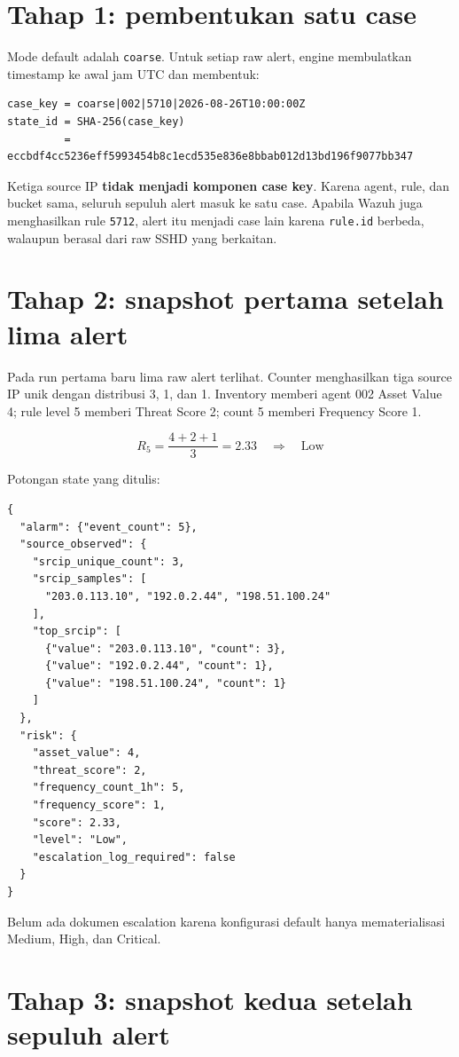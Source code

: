 \documentclass[11pt,a4paper,oneside]{report}
\DeclareRobustCommand{\code}[1]{\nolinkurl{#1}}
\begin{document}
\section{Tahap 1: pembentukan satu case}

Mode default adalah \code{coarse}. Untuk setiap raw alert, engine membulatkan
timestamp ke awal jam UTC dan membentuk:

\begin{lstlisting}
case_key = coarse|002|5710|2026-08-26T10:00:00Z
state_id = SHA-256(case_key)
         = eccbdf4cc5236eff5993454b8c1ecd535e836e8bbab012d13bd196f9077bb347
\end{lstlisting}

Ketiga source IP \textbf{tidak menjadi komponen case key}. Karena agent, rule,
dan bucket sama, seluruh sepuluh alert masuk ke satu case. Apabila Wazuh juga
menghasilkan rule \code{5712}, alert itu menjadi case lain karena
\code{rule.id} berbeda, walaupun berasal dari raw SSHD yang berkaitan.

\section{Tahap 2: snapshot pertama setelah lima alert}

Pada run pertama baru lima raw alert terlihat. Counter menghasilkan tiga source
IP unik dengan distribusi 3, 1, dan 1. Inventory memberi agent 002 Asset Value 4;
rule level 5 memberi Threat Score 2; count 5 memberi Frequency Score 1.

\[
R_5 = \frac{4+2+1}{3}=2.33 \quad\Longrightarrow\quad \text{Low}
\]

Potongan state yang ditulis:

\begin{lstlisting}
{
  "alarm": {"event_count": 5},
  "source_observed": {
    "srcip_unique_count": 3,
    "srcip_samples": [
      "203.0.113.10", "192.0.2.44", "198.51.100.24"
    ],
    "top_srcip": [
      {"value": "203.0.113.10", "count": 3},
      {"value": "192.0.2.44", "count": 1},
      {"value": "198.51.100.24", "count": 1}
    ]
  },
  "risk": {
    "asset_value": 4,
    "threat_score": 2,
    "frequency_count_1h": 5,
    "frequency_score": 1,
    "score": 2.33,
    "level": "Low",
    "escalation_log_required": false
  }
}
\end{lstlisting}

Belum ada dokumen escalation karena konfigurasi default hanya mematerialisasi
Medium, High, dan Critical.

\section{Tahap 3: snapshot kedua setelah sepuluh alert}
\end{document}
